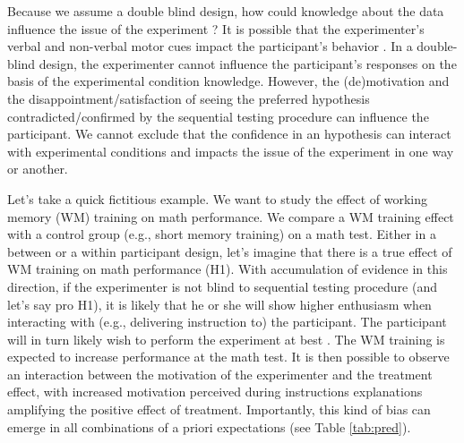 \documentclass[a4paper,man,natbib,floatsintext,donotrepeattitle]{apa6}
\begin{document}
Because we assume a double blind design, how could knowledge about the data influence the issue of the experiment ? It is possible that the experimenter's verbal and non-verbal motor cues impact the participant's behavior \citep{zoble_interaction_1969}. In a double-blind design, the experimenter cannot influence the participant's responses on the basis of the experimental condition knowledge. However, the (de)motivation and the disappointment/satisfaction of seeing the preferred hypothesis contradicted/confirmed by the sequential testing procedure can influence the participant. We cannot exclude that the confidence in an hypothesis can interact with experimental conditions and impacts the issue of the experiment in one way or another.\par

Let's take a quick fictitious example. We want to study the effect of working memory (WM) training on math performance. We compare a WM training effect with a control group (e.g., short memory training) on a math test. Either in a between or a within participant design, let's imagine that there is a true effect of WM training on math performance (H1). With accumulation of evidence in this direction, if the experimenter is not blind to sequential testing procedure (and let's say pro H1), it is likely that he or she will show higher enthusiasm when interacting with (e.g., delivering instruction to) the participant. The participant will in turn likely wish to perform the experiment at best \citep{zoble_interaction_1969}. The WM training is expected to increase performance at the math test. It is then possible to observe an interaction between the motivation of the experimenter and the treatment effect, with increased motivation perceived during instructions explanations amplifying the positive effect of treatment. Importantly, this kind of bias can emerge in all combinations of a priori expectations (see Table \ref{tab:pred}). \par


\end{document}
